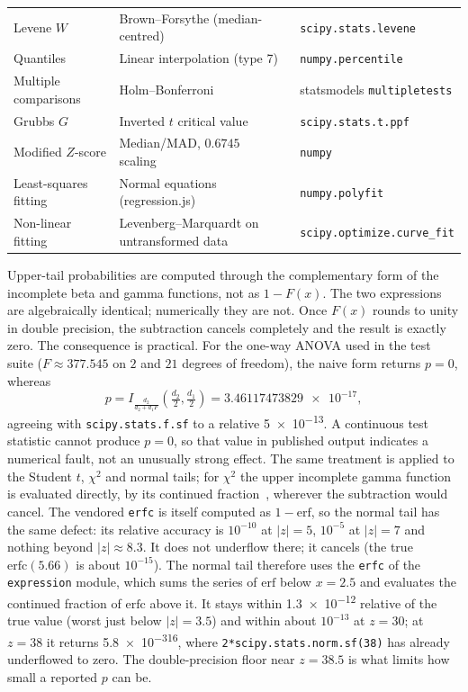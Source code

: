 \documentclass[11pt,a4paper]{article}
\begin{document}
\begin{table}[htbp]
\begin{tabular}{@{}>{\raggedright\arraybackslash}p{3.3cm}>{\raggedright\arraybackslash}p{5.0cm}>{\raggedright\arraybackslash}p{4.5cm}@{}}
Levene $W$ &
  Brown--Forsythe (median-centred) &
  \texttt{scipy.stats.levene} \\
Quantiles &
  Linear interpolation (type 7) &
  \texttt{numpy.percentile} \\
Multiple comparisons &
  Holm--Bonferroni~\cite{holm1979} &
  statsmodels \texttt{multipletests} \\
Grubbs $G$ &
  Inverted $t$ critical value &
  \texttt{scipy.stats.t.ppf} \\
Modified $Z$-score &
  Median/MAD, $0.6745$ scaling~\cite{iglewicz1993} &
  \texttt{numpy} \\
Least-squares fitting &
  Normal equations (regression.js) &
  \texttt{numpy.polyfit} \\
Non-linear fitting &
  Levenberg--Marquardt on untransformed data &
  \texttt{scipy.optimize.\allowbreak{}\mbox{curve\_fit}} \\
\bottomrule
\end{tabular}
\end{table}

Upper-tail probabilities are computed through the complementary form of the
incomplete beta and gamma functions, not as $1 - F(x)$. The two
expressions are algebraically identical; numerically they are not. Once $F(x)$
rounds to unity in double precision, the subtraction cancels completely and the
result is exactly zero. The consequence is practical. For the one-way ANOVA
used in the test suite ($F \approx 377.545$ on $2$ and $21$ degrees of freedom), the
naive form returns $p = 0$, whereas
\begin{equation}
  p = I_{\frac{d_2}{d_2 + d_1 F}}\!\left(\tfrac{d_2}{2}, \tfrac{d_1}{2}\right)
        = \num{3.46117473829e-17},
\end{equation}
agreeing with \texttt{scipy.stats.f.sf} to a relative \num{5e-13}. A continuous
test statistic cannot produce $p = 0$, so that value in published output
indicates a numerical fault, not an unusually strong effect. The same treatment is applied to the
Student $t$, $\chi^2$ and normal tails; for $\chi^2$ the upper incomplete gamma
function is evaluated directly, by its continued fraction~\cite{press2007},
wherever the subtraction would cancel. The vendored \texttt{erfc} is itself computed as $1 - \mathrm{erf}$, so the
normal tail has the same defect: its relative accuracy is $10^{-10}$ at
$|z| = 5$, $10^{-5}$ at $|z| = 7$ and nothing beyond $|z| \approx 8.3$. It does
not underflow there; it cancels (the true $\mathrm{erfc}(5.66)$ is about
$10^{-15}$). The normal tail therefore uses the \texttt{erfc} of the
\texttt{expression} module, which sums the series of $\mathrm{erf}$ below
$x = 2.5$ and evaluates the continued fraction of $\mathrm{erfc}$ above it. It
stays within \num{1.3e-12} relative of the true value (worst just below
$|z| = 3.5$) and within about $10^{-13}$ at $z = 30$; at $z = 38$ it returns
\num{5.8e-316}, where \texttt{2*scipy.stats.norm.sf(38)} has already underflowed
to zero. The double-precision floor near $z = 38.5$ is what limits how small a
reported $p$ can be.
\end{document}
